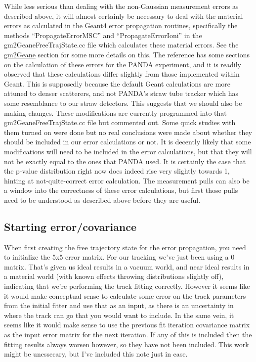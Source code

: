 		While less serious than dealing with the non-Gaussian measurement errors as described above, it will almost certainly be necessary to deal with the material errors as calculated in the Geant4 error propagation routines, specifically the methods ``PropagateErrorMSC'' and ``PropagateErrorIoni'' in the gm2GeaneFreeTrajState.cc file which calculates these material errors. See the \hyperref[sec:gm2Geane]{gm2Geane} section for some more details on this. The reference \cite{Lavezzi} has some sections on the calculation of these errors for the PANDA experiment, and it is readily observed that these calculations differ slightly from those implemented within Geant. This is supposedly because the default Geant calculations are more attuned to denser scatterers, and not PANDA's straw tube tracker which has some resemblance to our straw detectors. This suggests that we should also be making changes. These modifications are currently programmed into that gm2GeaneFreeTrajState.cc file but commented out. Some quick studies with them turned on were done but no real conclusions were made about whether they should be included in our error calculations or not. It is decently likely that some modifications will need to be included in the error calculations, but that they will not be exactly equal to the ones that PANDA used. It is certainly the case that the p-value distribution right now does indeed rise very slightly towards 1, hinting at not-quite-correct error calculation. The measurement pulls can also be a window into the correctness of these error calculations, but first those pulls need to be understood as described above before they are useful.

	\subsection{Starting error/covariance}

		When first creating the free trajectory state for the error propagation, you need to initialize the 5x5 error matrix. For our tracking we've just been using a 0 matrix. That's given us ideal results in a vacuum world, and near ideal results in a material world (with known effects throwing distributions slightly off), indicating that we're performing the track fitting correctly. However it seems like it would make conceptual sense to calculate some error on the track parameters from the initial fitter and use that as an input, as there is an uncertainty in where the track can go that you would want to include.  In the same vein, it seems like it would make sense to use the previous fit iteration covariance matrix as the input error matrix for the next iteration. If any of this is included then the fitting results always worsen however, so they have not been included. This work might be unessecary, but I've included this note just in case.

